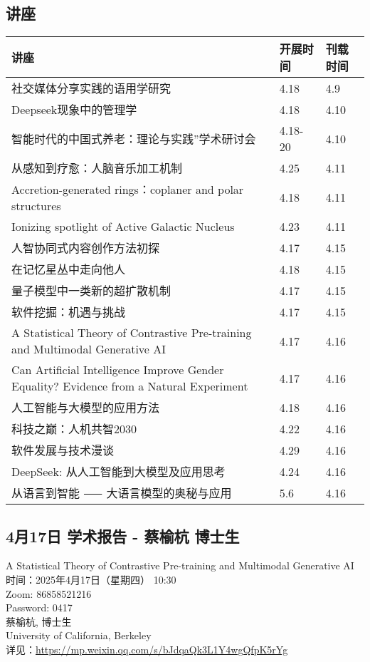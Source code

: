 \documentclass[letterpaper, 12pt]{article}
\begin{document}
\begin{multicols}{2}
\pagebreak

\section{讲座}
\begin{tabular}{|>{\centering\arraybackslash}m{}|m{}|m{}|}
    \hline
    讲座 & 开展时间 & 刊载时间\\
    \hline\hline
    社交媒体分享实践的语用学研究 & 4.18 & 4.9\\\hline
    Deepseek现象中的管理学 & 4.18 & 4.10\\\hline
    智能时代的中国式养老：理论与实践”学术研讨会 & 4.18-20 & 4.10\\\hline
    从感知到疗愈：人脑音乐加工机制 & 4.25 & 4.11\\\hline
    Accretion-generated rings：coplaner and polar structures & 4.18 & 4.11\\\hline
    Ionizing spotlight of Active Galactic Nucleus & 4.23 & 4.11\\\hline
    人智协同式内容创作方法初探 & 4.17 & 4.15\\\hline
    在记忆星丛中走向他人 & 4.18 & 4.15\\\hline
    量子模型中一类新的超扩散机制 & 4.17 & 4.15\\\hline
    软件挖掘：机遇与挑战 & 4.17 & 4.15\\\hline
    A Statistical Theory of Contrastive Pre-training and Multimodal Generative AI & 4.17 & 4.16\\\hline
    Can Artificial Intelligence Improve Gender Equality? Evidence from a Natural Experiment & 4.17 & 4.16\\\hline
    人工智能与大模型的应用方法 & 4.18 & 4.16\\\hline
    科技之巅：人机共智2030 & 4.22 & 4.16\\\hline
    软件发展与技术漫谈 & 4.29 & 4.16\\\hline
    DeepSeek: 从人工智能到大模型及应用思考 & 4.24 & 4.16\\\hline
    从语言到智能 ⸺ 大语言模型的奥秘与应用 & 5.6 & 4.16\\\hline
\end{tabular}
\subsection{4月17日 学术报告 - 蔡榆杭 博士生}
A Statistical Theory of Contrastive Pre-training and Multimodal Generative AI
\\时间：2025年4月17日（星期四） 10:30
\\Zoom: 86858521216
\\Password: 0417
\\蔡榆杭, 博士生
\\University of California, Berkeley
\\详见：\url{https://mp.weixin.qq.com/s/bJdqaQk3L1Y4wgQfpK5rYg}


\end{multicols}
\end{document}
